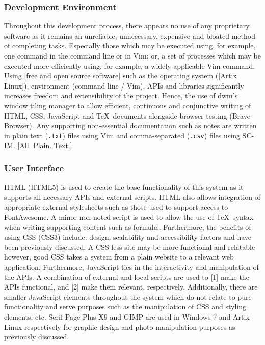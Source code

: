 \documentclass[11pt, english]{article}
\begin{document}
		\subsubsection{Development Environment}

	Throughout this development process, there appears no use of any proprietary software as it remains an unreliable, unnecessary, expensive and bloated method of completing tasks. Especially those which may be executed using, for example, one command in the command line or in Vim; or, a set of processes which may be executed more efficiently using, for example, a widely applicable Vim command. Using [free and open source software] such as the operating system ([Artix Linux]), environment (command line / Vim), APIs and libraries significantly increases freedom and extensibility of the project. Hence, the use of dwm's window tiling manager to allow efficient, continuous and conjunctive writing of HTML, CSS, JavaScript and {\TeX}\ documents alongside browser testing (Brave Browser). Any supporting non-essential documentation such as notes are written in plain text (\texttt{.txt}) files using Vim and comma-separated (\texttt{.csv}) files using SC-IM. [All. Plain. Text.]

		\subsubsection{User Interface}

	HTML (HTML5) is used to create the base functionality of this system as it supports all necessary APIs and external scripts. HTML also allows integration of appropriate external stylesheets such as those used to support access to FontAwesome. A minor non-noted script is used to allow the use of {\TeX}\ syntax when writing supporting content such as formul\ae. Furthermore, the benefits of using CSS (CSS3) include: design, scalability and accessibility factors and have been previously discussed. A CSS-less site may be more functional and relatable however, good CSS takes a system from a plain website to a relevant web application. Furthermore, JavaScript ties-in the interactivity and manipulation of the APIs. A combination of external and local scripts are used to [1] make the APIs functional, and [2] make them relevant, respectively. Additionally, there are smaller JavaScript elements throughout the system which do not relate to pure functionality and serve purposes such as the manipulation of CSS and styling elements, etc. Serif Page Plus X9 and GIMP are used in Windows 7 and Artix Linux respectively for graphic design and photo manipulation purposes as previously discussed.
\end{document}
